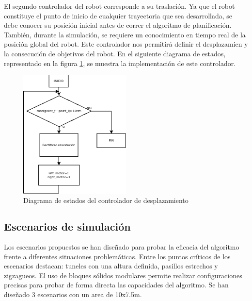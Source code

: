 El segundo controlador del robot corresponde a su traslación. Ya que el robot constituye el punto de inicio de cualquier trayectoria que sea desarrollada, se debe conocer su posición inicial antes de correr el algoritmo de planificación. También, durante la simulación, se requiere un conocimiento en tiempo real de la posición global del robot. Este controlador nos permitirá definir el desplazamien y la consecución de objetivos del robot. En el siguiente diagrama de estados, representado en la figura \ref{fig:flujoavance}, se muestra la implementación de este controlador.

\begin{figure}[H]
		\centering
        \includegraphics[width=0.5\textwidth]{images/flujoavance.png}
        \caption{Diagrama de estados del controlador de desplazamiento}
        \label{fig:flujoavance}
\end{figure} 

\subsection{Escenarios de simulación}

Los escenarios propuestos se han diseñado para probar la eficacia del algoritmo frente a diferentes situaciones problemáticas. Entre los puntos críticos de los escenarios destacan: tuneles con una altura definida, pasillos estrechos y zigzagueos. El uso de bloques sólidos modulares permite realizar configuraciones precisas para probar de forma directa las capacidades del algoritmo. Se han diseñado 3 escenarios con un area de 10x7.5m.

